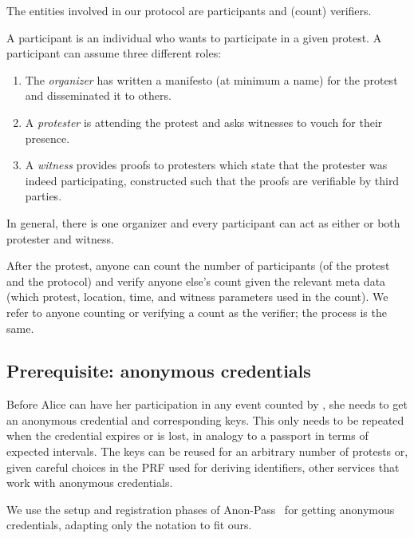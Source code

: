 
The entities involved in our protocol are participants and (count) verifiers.

A participant is an individual who wants to participate in a given 
protest.
A participant can assume three different roles:
\begin{enumerate}
\item The \emph{organizer} has written a manifesto (at minimum a name) for the protest and 
  disseminated it to others.
\item A \emph{protester} is attending the protest and asks witnesses to vouch 
  for their presence.
\item A \emph{witness} provides proofs to protesters which state that the 
  protester was indeed participating, constructed such that the proofs are verifiable by 
  third parties.
\end{enumerate}
In general, there is one organizer and every participant can act as
either or both protester and witness.

After the protest, anyone can count the number of participants (of the protest and the
protocol) and verify anyone else's count given the relevant meta data
(which protest, location, time, and witness parameters used in the
count). We refer to anyone counting or verifying a count as the
verifier; the process is the same. 

\subsection{Prerequisite: anonymous credentials}%
\label{ProtocolSetup}

Before Alice can have her participation in any event counted by
\CROCUS, she needs to get an anonymous credential and corresponding
keys. This only needs to be repeated when the credential expires or is
lost, in analogy to a passport in terms of expected intervals. The
keys can be reused for an arbitrary number of protests or, given
careful choices in the PRF used for deriving identifiers, other
services that work with anonymous credentials. 

We use the setup and registration phases of Anon-Pass~\cite{AnonPass} for
getting anonymous credentials, adapting only the notation to fit ours. 


